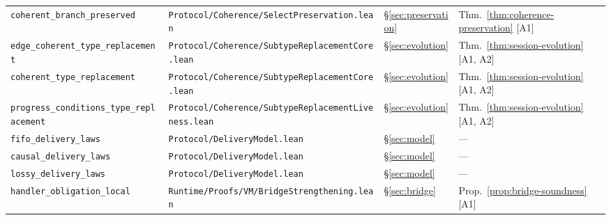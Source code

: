 \documentclass[a4paper,10pt,twocolumn,english]{article}
\numberwithin{equation}{section}
\theoremstyle{paperdef}
\theoremstyle{paperplain}
\theoremstyle{paperdef}
\theoremstyle{paperremark}
\begin{document}
\begin{table}[H]
\begin{tabularx}{\textwidth}{L{0.27\textwidth}L{0.37\textwidth}L{0.06\textwidth}>{\raggedright\arraybackslash}X}
		\texttt{coherent\_branch\_\allowbreak preserved}                          & \texttt{Protocol/\allowbreak Coherence/\allowbreak}\mbox{\texttt{SelectPreservation.lean}}                                        & \S\ref{sec:preservation} & Thm.~\ref{thm:coherence-preservation} [A1] \\
		\texttt{edge\_coherent\_type\_\allowbreak replacement}                    & \texttt{Protocol/\allowbreak Coherence/\allowbreak}\mbox{\texttt{SubtypeReplacementCore.lean}}                                    & \S\ref{sec:evolution}    & Thm.~\ref{thm:session-evolution} [A1, A2]  \\
		\texttt{coherent\_type\_\allowbreak replacement}                          & \texttt{Protocol/\allowbreak Coherence/\allowbreak}\mbox{\texttt{SubtypeReplacementCore.lean}}                                    & \S\ref{sec:evolution}    & Thm.~\ref{thm:session-evolution} [A1, A2]  \\
		\texttt{progress\_conditions\_\allowbreak type\_replacement}              & \texttt{Protocol/\allowbreak Coherence/\allowbreak}\mbox{\texttt{SubtypeReplacementLiveness.lean}}                                & \S\ref{sec:evolution}    & Thm.~\ref{thm:session-evolution} [A1, A2]  \\
		\texttt{fifo\_delivery\_laws}                                             & \texttt{Protocol/\allowbreak}\mbox{\texttt{DeliveryModel.lean}}                                                                   & \S\ref{sec:model}        & ---                                        \\
		\texttt{causal\_delivery\_laws}                                           & \texttt{Protocol/\allowbreak}\mbox{\texttt{DeliveryModel.lean}}                                                                   & \S\ref{sec:model}        & ---                                        \\
		\texttt{lossy\_delivery\_laws}                                            & \texttt{Protocol/\allowbreak}\mbox{\texttt{DeliveryModel.lean}}                                                                   & \S\ref{sec:model}        & ---                                        \\
		\texttt{handler\_obligation\_\allowbreak local}                           & \texttt{Runtime/\allowbreak Proofs/\allowbreak VM/\allowbreak}\mbox{\texttt{BridgeStrengthening.lean}}                            & \S\ref{sec:bridge}       & Prop.~\ref{prop:bridge-soundness} [A1]     \\

\end{tabularx}
\end{table}
\end{document}
